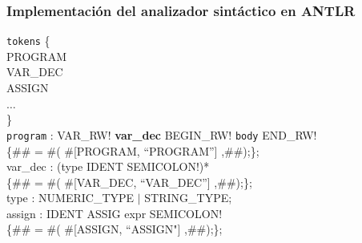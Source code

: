 \documentclass{beamer}
\begin{document}
		\begin{frame}
			\frametitle{Implementaci\'on del analizador sint\'actico en ANTLR}

            \begin{block}{}
                \texttt{tokens} \{ \\
			     \hspace{10px} PROGRAM \\
			     \hspace{10px} VAR\_DEC \\
			     \hspace{10px} ASSIGN \\
			     \hspace{10px} $\ldots$ \\
                \} \\
                \vspace{5px}
                \texttt{program} : VAR\_RW! \textbf{var\_dec} BEGIN\_RW! \texttt{body} END\_RW! \\
                \hspace{10px} \{\#\# = \#( \#[PROGRAM, ``PROGRAM''] ,\#\#);\}; \\
                \vspace{5px}
                var\_dec : (type IDENT SEMICOLON!)* \\
                \hspace{10px} \{\#\# = \#( \#[VAR\_DEC, ``VAR\_DEC''] ,\#\#);\}; \\
                \vspace{5px}
                type : NUMERIC\_TYPE $|$ STRING\_TYPE; \\
                \vspace{5px}
                assign : IDENT ASSIG expr SEMICOLON! \\
                \hspace{10px} \{\#\# = \#( \#[ASSIGN, ``ASSIGN"] ,\#\#);\}; \\
			\end{block}
		\end{frame}
\end{document}
